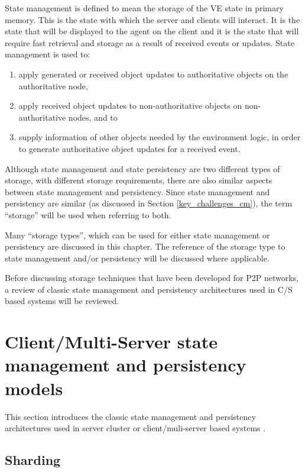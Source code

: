 State management is defined to mean the storage of the VE state in primary memory. This is the state with which the server and clients will interact. It is the state that will be displayed to the agent on the client and it is the state that will require fast retrieval and storage as a result of received events or updates. State management is used to:
\begin{enumerate}
\item apply generated or received object updates to authoritative objects on the authoritative node,
\item apply received object updates to non-authoritative objects on non-authoritative nodes, and to
\item supply information of other objects needed by the environment logic, in order to generate authoritative object updates for a received event.
\end{enumerate}

Although state management and state persistency are two different types of storage, with different storage requirements, there are also similar aspects between state management and persistency. Since state management and persistency are similar (as discussed in Section \ref{key_challenges_cm}), the term ``storage'' will be used when referring to both.

Many ``storage types'', which can be used for either state management or persistency are discussed in this chapter. The reference of the storage type to state management and/or persistency will be discussed where applicable.

Before discussing storage techniques that have been developed for P2P networks, a review of classic state management and persistency architectures used in C/S based systems will be reviewed.

\section{Client/Multi-Server state management and persistency models}
\label{cms_models}

This section introduces the classic state management and persistency architectures used in server cluster or client/muli-server based systems \cite{Hu_voronoi_IM}.

\subsection{Sharding}
\label{sharding}

